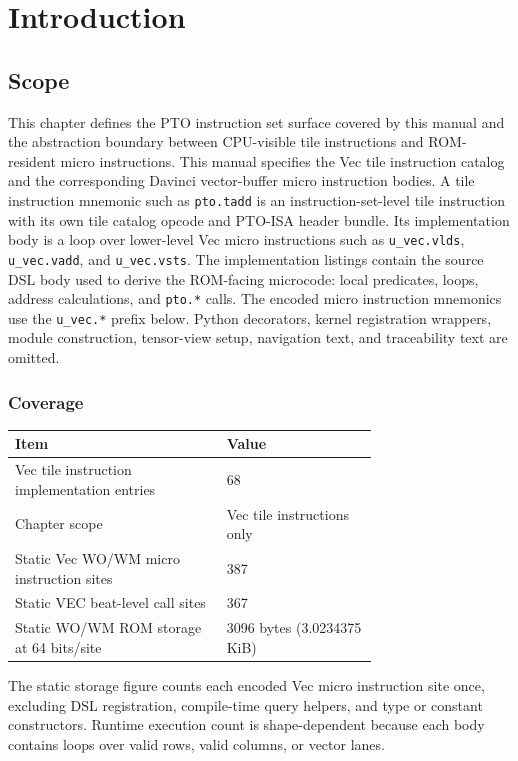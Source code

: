 \chapter{Introduction}
\label{chap:introduction}
\section{Scope}
This chapter defines the PTO instruction set surface covered by this manual and the abstraction boundary between CPU-visible tile instructions and ROM-resident micro instructions.
This manual specifies the Vec tile instruction catalog and the corresponding Davinci vector-buffer micro instruction bodies. A tile instruction mnemonic such as \texttt{pto.tadd} is an instruction-set-level tile instruction with its own tile catalog opcode and PTO-ISA header bundle. Its implementation body is a loop over lower-level Vec micro instructions such as \texttt{u\_vec.vlds}, \texttt{u\_vec.vadd}, and \texttt{u\_vec.vsts}.
The implementation listings contain the source DSL body used to derive the ROM-facing microcode: local predicates, loops, address calculations, and \texttt{pto.*} calls. The encoded micro instruction mnemonics use the \texttt{u\_vec.*} prefix below. Python decorators, kernel registration wrappers, module construction, tensor-view setup, navigation text, and traceability text are omitted.
\subsection{Coverage}
\begin{tabular}{@{}L{0.42\linewidth}R{0.30\linewidth}@{}}
\toprule
Item & Value \\
\midrule
Vec tile instruction implementation entries & 68 \\
Chapter scope & Vec tile instructions only \\
Static Vec WO/WM micro instruction sites & 387 \\
Static VEC beat-level call sites & 367 \\
Static WO/WM ROM storage at 64 bits/site & 3096 bytes (3.0234375 KiB) \\
\bottomrule
\end{tabular}
\par\smallskip
The static storage figure counts each encoded Vec micro instruction site once, excluding DSL registration, compile-time query helpers, and type or constant constructors. Runtime execution count is shape-dependent because each body contains loops over valid rows, valid columns, or vector lanes.

